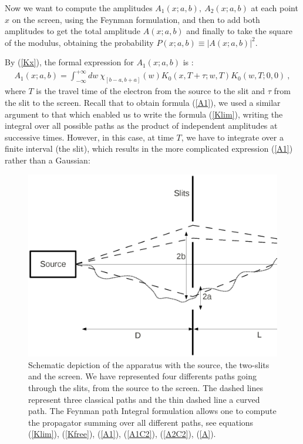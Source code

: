 \documentclass[12pt]{article}   %
\begin{document}
Now we want to compute the amplitudes $A_1(x;a,b),\ A_2(x;a,b)$
at each point $x$ on the screen, using the Feynman formulation,
and then to add both amplitudes to get the total amplitude
$A(x;a,b)$ and finally to take the square of the modulus,
obtaining the probability $P(x;a,b)\equiv |A(x;a,b)|^2$.

By (\ref{Kx}), the formal expression for $A_1(x;a,b)$ is :
\begin{eqnarray}\label{A1}
A_1(x;a,b)=\int_{-\infty}^{+\infty} dw\ \chi_{[b-a,b+a]}(w)
K_0(x,T+\tau;w,T) K_0(w,T;0,0)\ ,
\end{eqnarray}
where $T$ is the travel time of the electron from the source to
the slit and $\tau$ from the slit to the screen. 
Recall that to obtain formula
(\ref{A1}), we used a similar argument to that which enabled us to
write the formula (\ref{Klim}), writing the integral over all
possible paths as the product of independent amplitudes at
successive times. However, in this case, at time $ T $, we have to
integrate over a finite interval (the slit), which results in the
more complicated expression (\ref{A1}) rather than a Gaussian:

\begin{figure}
 \centering
\includegraphics[width=130mm]{Fig1.ps}
\caption{\label{Fig.1} Schematic depiction of the apparatus with
the source, the two-slits and the screen.
We have represented four differents paths going through the slits, from the source to the screen.
{The dashed lines represent three classical paths and the thin dashed line a curved path.
The Feynman path Integral formulation allows one to compute the propagator 
summing over all different paths, see equations 
(\ref{Klim}), (\ref{Kfree}), (\ref{A1}), (\ref{A1C2}), (\ref{A2C2}), (\ref{A}).}}
\end{figure}
\end{document}
